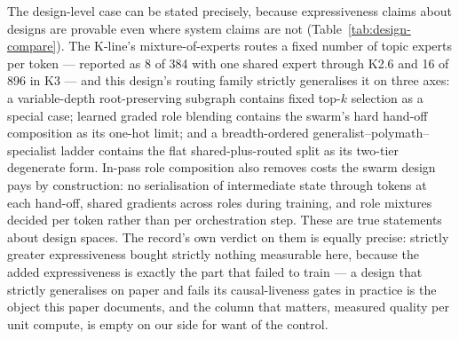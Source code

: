 \documentclass[10pt,a4paper]{article}
\begin{document}
The design-level case can be stated precisely, because expressiveness claims
about designs are provable even where system claims are not
(Table~\ref{tab:design-compare}). The K-line's mixture-of-experts routes a
fixed number of topic experts per token --- reported as 8 of 384 with one shared
expert through K2.6 and 16 of 896 in K3 \cite{kimik2report,pandaily2026k3} --- and this
design's routing family strictly generalises it on three axes: a
variable-depth root-preserving subgraph contains fixed top-$k$ selection as a
special case; learned graded role blending contains the swarm's hard
hand-off composition as its one-hot limit; and a breadth-ordered
generalist--polymath--specialist ladder contains the flat shared-plus-routed
split as its two-tier degenerate form. In-pass role composition also removes
costs the swarm design pays by construction: no serialisation of
intermediate state through tokens at each hand-off, shared gradients across
roles during training, and role mixtures decided per token rather than per
orchestration step. These are true statements about design spaces. The
record's own verdict on them is equally precise: strictly greater
expressiveness bought strictly nothing measurable here, because the added
expressiveness is exactly the part that failed to train --- a design that
strictly generalises on paper and fails its causal-liveness gates in practice is the
object this paper documents, and the column that matters, measured quality
per unit compute, is empty on our side for want of the control.
\end{document}

